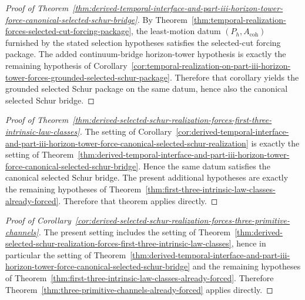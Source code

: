 \begin{proof}[Proof of Theorem~\ref{thm:derived-temporal-interface-and-part-iii-horizon-tower-force-canonical-selected-schur-bridge}]
\label{proof:thm:derived-temporal-interface-and-part-iii-horizon-tower-force-canonical-selected-schur-bridge}
By Theorem~\ref{thm:temporal-realization-forces-selected-cut-forcing-package},
the least-motion datum \((P_h,A_{\mathrm{coh}})\) furnished by the stated
selection hypotheses satisfies the selected-cut forcing package. The added
continuum-bridge horizon-tower hypothesis is exactly the remaining hypothesis of
Corollary~\ref{cor:temporal-realization-on-part-iii-horizon-tower-forces-grounded-selected-schur-package}.
Therefore that corollary yields the grounded selected Schur package on the same
datum, hence also the canonical selected Schur bridge.
\end{proof}

\begin{proof}[Proof of Theorem~\ref{thm:derived-selected-schur-realization-forces-first-three-intrinsic-law-classes}]
\label{proof:thm:derived-selected-schur-realization-forces-first-three-intrinsic-law-classes}
The setting of
Corollary~\ref{cor:derived-temporal-interface-and-part-iii-horizon-tower-force-canonical-selected-schur-realization}
is exactly the setting of
Theorem~\ref{thm:derived-temporal-interface-and-part-iii-horizon-tower-force-canonical-selected-schur-bridge}.
Hence the same datum satisfies the canonical selected Schur bridge. The
present additional hypotheses are exactly the remaining hypotheses of
Theorem~\ref{thm:first-three-intrinsic-law-classes-already-forced}. Therefore
that theorem applies directly.
\end{proof}

\begin{proof}[Proof of Corollary~\ref{cor:derived-selected-schur-realization-forces-three-primitive-channels}]
\label{proof:cor:derived-selected-schur-realization-forces-three-primitive-channels}
The present setting includes the setting of
Theorem~\ref{thm:derived-selected-schur-realization-forces-first-three-intrinsic-law-classes},
hence in particular the setting of
Theorem~\ref{thm:derived-temporal-interface-and-part-iii-horizon-tower-force-canonical-selected-schur-bridge}
and the remaining hypotheses of
Theorem~\ref{thm:first-three-intrinsic-law-classes-already-forced}. Therefore
Theorem~\ref{thm:three-primitive-channels-already-forced} applies directly.
\end{proof}

